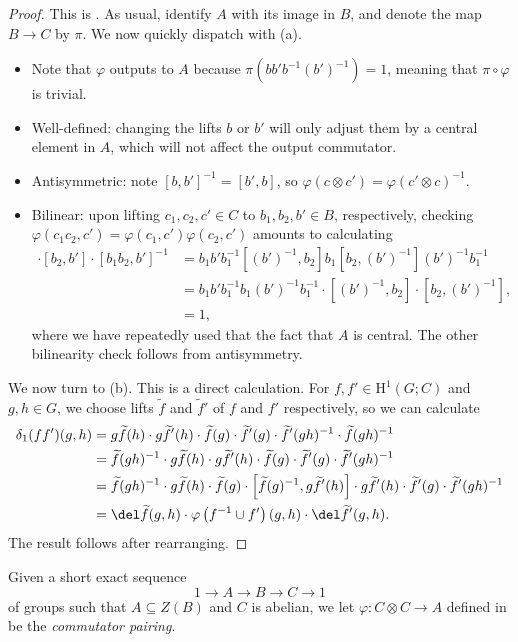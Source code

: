 \documentclass[notes.tex]{subfiles}
\begin{document}
\begin{proof}
	This is \cite[Section~1]{zarhin-cup-prod}. As usual, identify $A$ with its image in $B$, and denote the map $B\to C$ by $\pi$. We now quickly dispatch with (a).
	\begin{itemize}
		\item Note that $\varphi$ outputs to $A$ because $\pi\left(bb'b^{-1}(b')^{-1}\right)=1$, meaning that $\pi\circ\varphi$ is trivial.
		\item Well-defined: changing the lifts $b$ or $b'$ will only adjust them by a central element in $A$, which will not affect the output commutator.
		\item Antisymmetric: note $[b,b']^{-1}=[b',b]$, so $\varphi(c\otimes c')=\varphi(c'\otimes c)^{-1}$.
		\item Bilinear: upon lifting $c_1,c_2,c'\in C$ to $b_1,b_2,b'\in B$, respectively, checking $\varphi(c_1c_2, c')=\varphi(c_1,c')\varphi(c_2,c')$ amounts to calculating
		\begin{align*}
			[b_1,b']\cdot[b_2,b']\cdot[b_1b_2,b']^{-1} &= b_1b'b_1^{-1}\left[(b')^{-1},b_2\right]b_1\left[b_2,(b')^{-1}\right](b')^{-1}b_1^{-1} \\
			&= b_1b'b_1^{-1}b_1(b')^{-1}b_1^{-1}\cdot\left[(b')^{-1},b_2\right]\cdot\left[b_2,(b')^{-1}\right], \\
			&= 1,
		\end{align*}
		where we have repeatedly used that the fact that $A$ is central. The other bilinearity check follows from antisymmetry.
	\end{itemize}
	We now turn to (b). This is a direct calculation. For $f,f'\in\mathrm H^1(G;C)$ and $g,h\in G$, we choose lifts $\widetilde f$ and $\widetilde f'$ of $f$ and $f'$ respectively, so we can calculate
	\begin{align*}
		\delta_1(ff')(g,h) &= g\widetilde f(h)\cdot g\widetilde f'(h)\cdot\widetilde f(g)\cdot\widetilde f'(g)\cdot\widetilde f'(gh)^{-1}\cdot\widetilde f(gh)^{-1} \\
		&= \widetilde f(gh)^{-1}\cdot g\widetilde f(h)\cdot g\widetilde f'(h)\cdot\widetilde f(g)\cdot\widetilde f'(g)\cdot\widetilde f'(gh)^{-1} \\
		&= \widetilde f(gh)^{-1}\cdot g\widetilde f(h)\cdot\widetilde f(g)\cdot\left[\widetilde f(g)^{-1},g\widetilde f'(h)\right]\cdot g\widetilde f'(h)\cdot\widetilde f'(g)\cdot\widetilde f'(gh)^{-1} \\
		&= \del\widetilde f(g,h)\cdot\varphi\left(f^{-1}\cup f'\right)(g,h)\cdot\del\widetilde f'(g,h).
	\end{align*}
	The result follows after rearranging.
\end{proof}
\begin{definition}
	Given a short exact sequence
	\[1\to A\to B\to C\to1\]
	of groups such that $A\subseteq Z(B)$ and $C$ is abelian, we let $\varphi\colon C\otimes C\to A$ defined in  be the \textit{commutator pairing}.
\end{definition}
\end{document}
